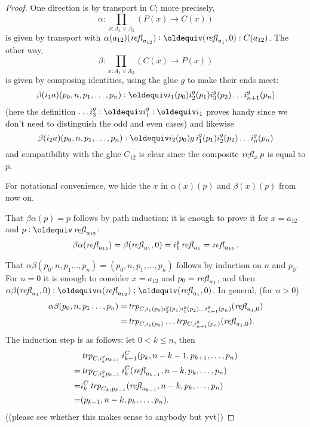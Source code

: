 {\begin{proof}
One direction is by transport in $C$; more precisely, 
$$\alpha:\prod_{x:A_1\vee A_2}(P(x)\to C(x))$$ is given by transport with $\alpha(a_{12})(\refl{a_{12}})\defequi(\refl{a_{1}},0):C(a_{12})$.  %
The other way, 
$$\beta:\prod_{x:A_1\vee A_2}(C(x)\to P(x))$$ is given by composing identities, using the glue $g$ to make their ends meet: 
$$\beta(i_1a)(p_0,n,p_1,\dots,p_n)\defequi i_1(p_0)i_2^g(p_1)i_3^g(p_2) \dots i_{n+1}^g(p_n)$$ 
(here the definition $\dots i_3^g\defequi i_1^g\defequi i_1$ proves handy since we don't need to distinguish the odd and even cases)  %
and likewise 
$$\beta(i_2a)(p_0,n,p_1,\dots,p_n)\defequi i_2(p_0)g\,i_1^g(p_1)i_2^g(p_2) \dots i_{n}^g(p_n)$$ and compatibility with the glue $C_{12}$ is clear since the composite $\mathop{\mathit{refl}_{x}}p$ is equal to $p$.

For notational convenience, we hide the $x$ in $\alpha(x)(p)$ and $\beta(x)(p)$ from now on.

That $\beta\alpha(p)=p$ follows by path induction: it is enough to prove it for $x=a_{12}$ and
$p\defequi\refl{a_{12}}$:
$$\beta\alpha(\mathop{\mathit{refl}_{a_{12}}})=\beta(\mathop{\mathit{refl}_{a_1}},0)=i_1^g\mathop{\mathit{refl}_{a_1}}=\mathop{\mathit{refl}_{a_{12}}}.$$  

That $\alpha\beta(p_0,n,p_1\dots,p_n)=(p_0,n,p_1,\dots,p_n)$ follows by induction on $n$ and $p_0$.  For $n=0$ it is enough to consider  $x=a_{12}$ and $p_0=\mathop{\mathit{refl}_{a_1}}$, and then 
$\alpha\beta(\refl{a_1},0)\defequi\alpha(\refl{a_{12}})\defequi(\refl{a_1},0)$.  In general, (for $n>0$) 
\begin{align*}
  \alpha\beta(p_0,n,p_1\dots,p_n)
=&\trp[C]{i_1(p_0)i_2^g(p_1)i_1^g(p_2) \dots i_{n+1}^g(p_n)}(\refl{a_1,0})\\
=&\trp[C]{i_1(p_0)}\dots\trp[C]{i_{n+1}^g(p_n)}(\refl{a_1,0}).
\end{align*}
  The induction step is as follows: let $0< k\leq n$, then 
\begin{align*}
  &\trp[C]{i_k^gp_{k-1}}i^C_{k-1}(p_k,n-k-1,p_{k+1},\dots,p_n)\\
  =&\trp[C]{i_k^gp_{k-1}}i^C_k(\refl{a_{k-1}},n-k,p_k,\dots,p_n)\\
  =&i^C_k\trp[C_k]{p_{k-1}}(\refl{a_{k-1}},n-k,p_k,\dots,p_n)\\
  =&(p_{k-1},n-k,p_k,\dots,p_n).
\end{align*}
((please see whether this makes sense to anybody but yvt))
\end{proof}

}
